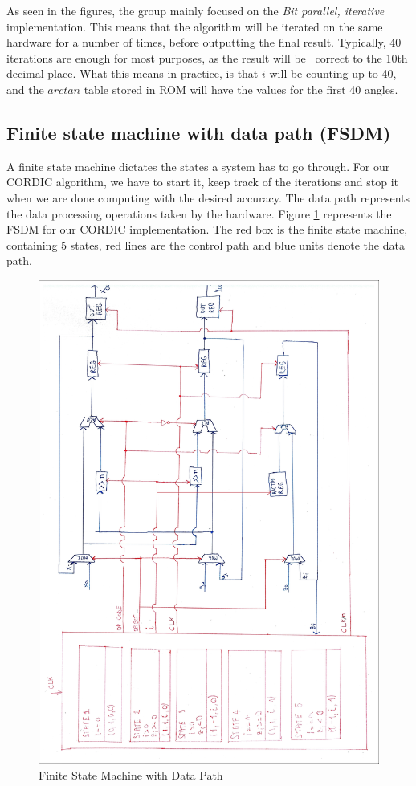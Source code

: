 \documentclass[12pt, a4paper,oneside]{article}
\begin{document}
As seen in the figures, the group mainly focused on the \textit{Bit parallel,
iterative} implementation. This means that the algorithm will be iterated on 
the same hardware for a number of times, before outputting the final result.
Typically, 40 iterations are enough for most purposes, as the result will be \
correct to the 10th decimal place\cite{cordic2}. What this means in practice,
is that $i$ will be counting up to 40, and the $arctan$ table stored in ROM
will have the values for the first 40 angles.

\subsection{Finite state machine with data path (FSDM)}\label{ssec:fsdm}
A finite state machine dictates the states a system has to go through.
For our CORDIC algorithm, we have to start it, keep track of the iterations
and stop it when we are done computing with the desired accuracy. 
The data path represents the data processing operations taken by the hardware.
Figure \ref{fig:finite_state_machine} represents the FSDM for our CORDIC
implementation. The red box is the finite state machine, containing 5 states,
red lines are the control path and blue units denote the data path.

\begin{figure}[H]
	\centering
	\includegraphics[width = \linewidth]{finite_state_machine_edit.jpg}
	\caption{Finite State Machine with Data Path}
	\label{fig:finite_state_machine}
\end{figure}
\end{document}
